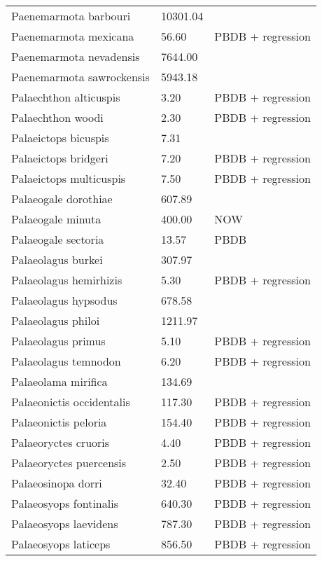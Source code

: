 \begin{longtable}{p{} p{} p{}}
    Paenemarmota barbouri & 10301.04 & \cite{Tomiya2013} \\ 
    Paenemarmota mexicana & 56.60 & PBDB + regression \\ 
    Paenemarmota nevadensis & 7644.00 & \cite{McKenna2011} \\ 
    Paenemarmota sawrockensis & 5943.18 & \cite{Tomiya2013} \\ 
    Palaechthon alticuspis & 3.20 & PBDB + regression \\ 
    Palaechthon woodi & 2.30 & PBDB + regression \\ 
    Palaeictops bicuspis & 7.31 & \cite{Simons1960} \\ 
    Palaeictops bridgeri & 7.20 & PBDB + regression \\ 
    Palaeictops multicuspis & 7.50 & PBDB + regression \\ 
    Palaeogale dorothiae & 607.89 & \cite{Tomiya2013} \\ 
    Palaeogale minuta & 400.00 & NOW \\ 
    Palaeogale sectoria & 13.57 & PBDB \\ 
    Palaeolagus burkei & 307.97 & \cite{Tomiya2013} \\ 
    Palaeolagus hemirhizis & 5.30 & PBDB + regression \\ 
    Palaeolagus hypsodus & 678.58 & \cite{Tomiya2013} \\ 
    Palaeolagus philoi & 1211.97 & \cite{Tomiya2013} \\ 
    Palaeolagus primus & 5.10 & PBDB + regression \\ 
    Palaeolagus temnodon & 6.20 & PBDB + regression \\ 
    Palaeolama mirifica & 134.69 & \cite{Smith2004} \\ 
    Palaeonictis occidentalis & 117.30 & PBDB + regression \\ 
    Palaeonictis peloria & 154.40 & PBDB + regression \\ 
    Palaeoryctes cruoris & 4.40 & PBDB + regression \\ 
    Palaeoryctes puercensis & 2.50 & PBDB + regression \\ 
    Palaeosinopa dorri & 32.40 & PBDB + regression \\ 
    Palaeosyops fontinalis & 640.30 & PBDB + regression \\ 
    Palaeosyops laevidens & 787.30 & PBDB + regression \\ 
    Palaeosyops laticeps & 856.50 & PBDB + regression \\ 

\end{longtable}
